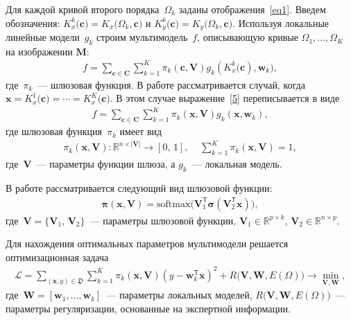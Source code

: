 \documentclass[12pt]{a&t}
\begin{document}
Для каждой кривой второго порядка~$\Omega_k$ заданы отображения~\eqref{eq1}. Введем обозначения: $K_x^k\bigr(\mathbf{c}\bigr) = K_x\bigr(\Omega_k, \mathbf{c}\bigr)$ и $K_y^k\bigr(\mathbf{c}\bigr) = K_y\bigr(\Omega_k, \mathbf{c}\bigr)$. Используя локальные линейные модели~$g_k$ строим мультимодель~$f$, описывающую кривые $\Omega_1, \dots, \Omega_K$ на изображении $\mathbf{M}$:
\begin{gather}
\label{5}
	f = \sum\limits_{\mathbf{c} \in \mathbf{C}} \sum_{k = 1}^{K} \pi_k(\mathbf{c}, \mathbf{V})g_k(K^k_{x}\bigl(\mathbf{c}), \mathbf{w}_k), 
\end{gather}
где~$\pi_k$~--- шлюзовая функция. В работе рассматривается случай, когда~$\mathbf{x}=K^1_{x}\bigl(\mathbf{c})=\cdots=K^K_{x}\bigl(\mathbf{ c}).$ В этом случае выражение~\eqref{5} переписывается в виде
\begin{gather}
\label{5_1}
	f = \sum\limits_{\mathbf{c} \in \mathbf{C}} \sum_{k = 1}^{K} \pi_k(\mathbf{x}, \mathbf{V})g_k(\mathbf{x}, \mathbf{w}_k), 
\end{gather}
где шлюзовая функция~$\pi_k$ имеет вид
\begin{gather}
\label{6}
	\pi_k(\mathbf{x}, \mathbf{V}): \mathbb{R}^{n\times |\mathbf{V}|} \rightarrow [0, \, 1], \; \; \; \; \sum\limits_{k = 1}^{K}\pi_k(\mathbf{x}, \mathbf{V}) = 1,
\end{gather}
где~$\mathbf{V}$~--- параметры функции шлюза, а $g_k$~--- локальная модель.

В работе рассматривается следующий вид шлюзовой функции:
\begin{gather}
    \boldsymbol{\pi}(\mathbf{x}, \mathbf{V}) = \text{softmax}\bigl(\mathbf{V}_1^{\mathsf{T}}\boldsymbol{\sigma}(\mathbf{V}_2^{\mathsf{T}}\mathbf{x}) \bigr),
\end{gather}
где~$\mathbf{V} = \{\mathbf{V}_1, \, \mathbf{V}_2\}$~--- параметры шлюзовой функции, $\mathbf{V}_1 \in \mathbb{R}^{p \times k}, \, \mathbf{V}_2 \in \mathbb{R}^{n \times p}$.

Для нахождения оптимальных параметров мультимодели решается оптимизационная задача
\begin{gather}
\label{9}
\mathcal{L} = \sum\limits_{(\mathbf{x}, y) \in \mathfrak{D}} \sum\limits_{k = 1}^{K} \pi_k(\mathbf{x}, \mathbf{V})(y - \mathbf{w}_k^{\mathsf{T}}\mathbf{x})^2 + R\bigl(\mathbf{V}, \mathbf{W}, E(\Omega)\bigr) \rightarrow \min_{\mathbf{V}, \mathbf{W}},
\end{gather}
где~$\mathbf{W} = [\mathbf{w}_1, \dots, \mathbf{w}_k]$~--- параметры локальных моделей, $R\bigl(\mathbf{V}, \mathbf{W}, E(\Omega)\bigr)$~--- параметры регуляризации, основанные на экспертной информации.
\end{document}
